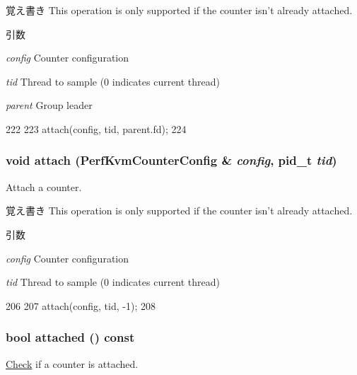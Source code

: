 \begin{DoxyNote}{覚え書き}
This operation is only supported if the counter isn't already attached.
\end{DoxyNote}

\begin{DoxyParams}{引数}
\item[{\em config}]Counter configuration \item[{\em tid}]Thread to sample (0 indicates current thread) \item[{\em parent}]Group leader \end{DoxyParams}



\begin{DoxyCode}
222                                                          {
223         attach(config, tid, parent.fd);
224     }
\end{DoxyCode}
\hypertarget{classPerfKvmCounter_a162e5b205959ecba29def7e7e0bf92dd}{
\subsubsection[{attach}]{\setlength{\rightskip}{0pt plus 5cm}void attach ({\bf PerfKvmCounterConfig} \& {\em config}, \/  pid\_\-t {\em tid})}}
\label{classPerfKvmCounter_a162e5b205959ecba29def7e7e0bf92dd}
Attach a counter.

\begin{DoxyNote}{覚え書き}
This operation is only supported if the counter isn't already attached.
\end{DoxyNote}

\begin{DoxyParams}{引数}
\item[{\em config}]Counter configuration \item[{\em tid}]Thread to sample (0 indicates current thread) \end{DoxyParams}



\begin{DoxyCode}
206                                                          {
207         attach(config, tid, -1);
208     }
\end{DoxyCode}
\hypertarget{classPerfKvmCounter_aa828991b44e099ad372a7833c34d3e24}{
\subsubsection[{attached}]{\setlength{\rightskip}{0pt plus 5cm}bool attached () const}}
\label{classPerfKvmCounter_aa828991b44e099ad372a7833c34d3e24}
\hyperlink{classCheck}{Check} if a counter is attached. 


